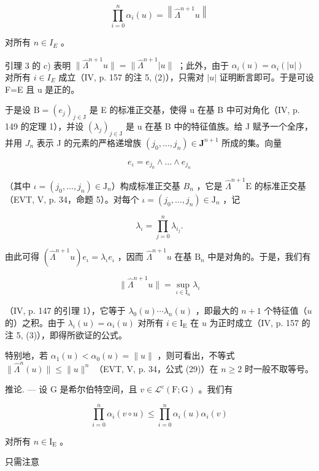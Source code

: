 \[
\prod_ {i = 0} ^ {n} \alpha_ {i} (u) = \left\| \widehat {\Lambda} ^ {n + 1} u \right\|
\]

对所有 \(n \in I_{E}\) 。

引理 3 的 c) 表明 \(\|\widehat{\Lambda}^{n+1}u\|=\|\widehat{\Lambda}^{n+1}|u\|\) ；此外，由于 \(\alpha_{i}(u)=\alpha_{i}(|u|)\) 对所有 \(i\in I_{E}\) 成立（IV, p. 157 的注 5, (2)），只需对 \(|u|\) 证明断言即可。于是可设 F=E 且 u 是正的。

于是设 \(\mathrm{B}=(e_{j})_{j\in\mathrm{J}}\) 是 E 的标准正交基，使得 u 在基 B 中可对角化（IV, p. 149 的定理 1），并设 \((\lambda_{j})_{j\in\mathrm{J}}\) 是 u 在基 B 中的特征值族。给 J 赋予一个全序，并用 \(J_{n}\) 表示 J 的元素的严格递增族 \((j_{0},\ldots,j_{n})\in\mathbf{J}^{n+1}\) 所成的集。向量

\[
e _ {\iota} = e _ {j _ {0}} \wedge \dots \wedge e _ {j _ {n}}
\]

（其中 \(\iota=(j_{0},\ldots,j_{n})\in\mathrm{J}_{n}\)）构成标准正交基 \(B_{n}\) ，它是 \(\widehat{\Lambda}^{n+1}\mathrm{E}\) 的标准正交基（EVT, V, p. 34，命题 5）。对每个 \(\iota=(j_{0},\ldots,j_{n})\in\mathrm{J}_{n}\) ，记

\[
\lambda_ {\iota} = \prod_ {j = 0} ^ {n} \lambda_ {i _ {j}}.
\]

由此可得 \((\hat{\Lambda}^{n + 1}u)e_{\iota} = \lambda_{\iota}e_{\iota}\) ，因而 \(\hat{\Lambda}^{n + 1}u\) 在基 \(\mathrm{B}_n\) 中是对角的。于是，我们有

\[
\| \widehat {\Lambda} ^ {n + 1} u \| = \sup _ {\iota \in \mathrm{I} _ {n}} \lambda_ {\iota}
\]

（IV, p. 147 的引理 1），它等于 \(\lambda_{0}(u)\cdots\lambda_{n}(u)\) ，即最大的 \(n+1\) 个特征值（\(u\) 的）之积。由于 \(\lambda_{i}(u)=\alpha_{i}(u)\) 对所有 \(i\in\mathrm{I}_{\mathrm{E}}\) 在 \(u\) 为正时成立（IV, p. 157 的注 5, (3)），即得所欲证的公式。

特别地，若 \(\alpha_{1}(u) < \alpha_{0}(u) = \| u\|\) ，则可看出，不等式 \(\| \widehat{\Lambda}^{n}(u)\| \leqslant \| u\|^{n}\) （EVT, V, p. 34，公式 (29)）在 \(n \geqslant 2\) 时一般不取等号。

推论. --- 设 G 是希尔伯特空间，且 \(v \in \mathcal{L}^{\mathrm{c}}(\mathrm{F};\mathrm{G})\) 。我们有

\[
\prod_ {i = 0} ^ {n} \alpha_ {i} (v \circ u) \leqslant \prod_ {i = 0} ^ {n} \alpha_ {i} (u) \alpha_ {i} (v)
\]

对所有 \(n \in \mathrm{I}_{\mathrm{E}}\) 。

只需注意

